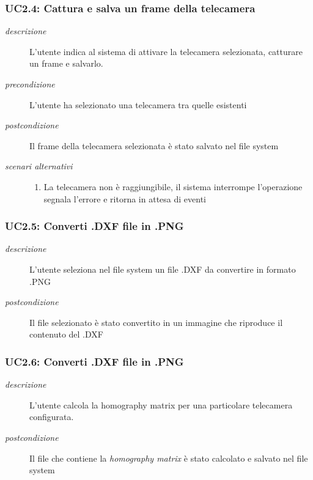 \subsubsection{UC2.4: Cattura e salva un frame della telecamera} \label{sec:uc2.4}
 \begin{description}
 \item[\em{descrizione}] L'utente indica al sistema di attivare la telecamera selezionata, catturare un frame e salvarlo.
  
  \item[\em{precondizione}] L'utente ha selezionato una telecamera tra quelle esistenti
  
  \item[\em{postcondizione}] Il frame della telecamera selezionata è stato salvato nel file system
  
\item[\em{scenari alternativi}]  \mbox{}
    \begin{enumerate} 
  \item La telecamera non è raggiungibile, il sistema interrompe l'operazione segnala l'errore e ritorna in attesa di eventi
  \end{enumerate}   
 \end{description}
 
 \subsubsection{UC2.5: Converti .DXF file in .PNG} \label{sec:uc2.5}
 \begin{description}
 \item[\em{descrizione}] L'utente seleziona nel file system un file .DXF da convertire in formato .PNG 
    
  \item[\em{postcondizione}] Il file selezionato è stato convertito in un immagine che riproduce il contenuto del .DXF
  
 \end{description}
 
 \subsubsection{UC2.6: Converti .DXF file in .PNG} \label{sec:uc2.6}
 \begin{description}
 \item[\em{descrizione}] L'utente calcola la homography matrix per una particolare telecamera configurata.
  \item[\em{postcondizione}] Il file che contiene la \textit{homography matrix} è stato calcolato e salvato nel file system
  
 \end{description}
 
